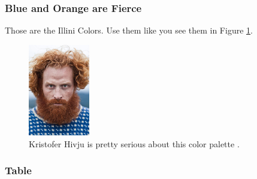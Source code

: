 \begin{frame}
  \frametitle{Blue and Orange are Fierce}
        Those are the Illini Colors. Use them like you see them in Figure
        \ref{fig:fierce}.
  \begin{figure}[htbp!]
    \begin{center}
      \includegraphics[height=4cm]{./images/fierce}
    \end{center}
          \caption{Kristofer Hivju is pretty serious about this color palette \cite{lastname_firstword_1900}.}
    \label{fig:fierce}
  \end{figure}
\end{frame}

\begin{frame}
        \frametitle{Table}
        
\end{frame}
